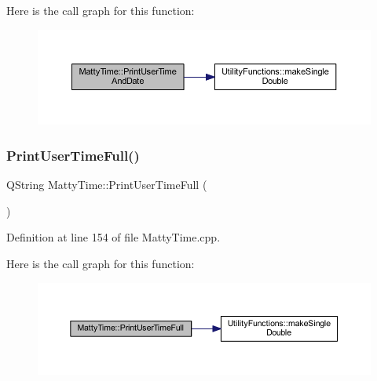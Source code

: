Here is the call graph for this function\+:
\nopagebreak
\begin{figure}[H]
\begin{center}
\leavevmode
\includegraphics[width=350pt]{classMattyTime_afa30c1dd3bae1e8f50e816803f39d1c4_cgraph}
\end{center}
\end{figure}
\hypertarget{classMattyTime_a3fda0198071ebc95afe2d4405dd9c55e}{}\label{classMattyTime_a3fda0198071ebc95afe2d4405dd9c55e} 
\subsubsection{\texorpdfstring{Print\+User\+Time\+Full()}{PrintUserTimeFull()}}
{\footnotesize\ttfamily Q\+String Matty\+Time\+::\+Print\+User\+Time\+Full (\begin{DoxyParamCaption}{ }\end{DoxyParamCaption})}



Definition at line 154 of file Matty\+Time.\+cpp.

Here is the call graph for this function\+:
\nopagebreak
\begin{figure}[H]
\begin{center}
\leavevmode
\includegraphics[width=350pt]{classMattyTime_a3fda0198071ebc95afe2d4405dd9c55e_cgraph}
\end{center}
\end{figure}
\hypertarget{classMattyTime_a6bcaa1f4975d99ab2f9025076de5ef99}{}\label{classMattyTime_a6bcaa1f4975d99ab2f9025076de5ef99} 
